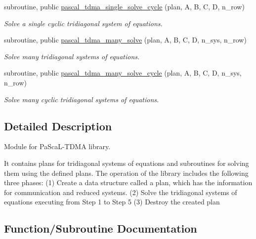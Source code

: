 \begin{DoxyCompactItemize}
subroutine, public \mbox{\hyperlink{namespacepascal__tdma_ac8e377fa86c75126380f0196f6046043}{pascal\+\_\+tdma\+\_\+single\+\_\+solve\+\_\+cycle}} (plan, A, B, C, D, n\+\_\+row)
\begin{DoxyCompactList}\small\item\em Solve a single cyclic tridiagonal system of equations. \end{DoxyCompactList}\item 
subroutine, public \mbox{\hyperlink{namespacepascal__tdma_afa0c78b8377f5fe1059907befda3c940}{pascal\+\_\+tdma\+\_\+many\+\_\+solve}} (plan, A, B, C, D, n\+\_\+sys, n\+\_\+row)
\begin{DoxyCompactList}\small\item\em Solve many tridiagonal systems of equations. \end{DoxyCompactList}\item 
subroutine, public \mbox{\hyperlink{namespacepascal__tdma_acbaed65e67ecbfd92a8f1d51d1b69fd5}{pascal\+\_\+tdma\+\_\+many\+\_\+solve\+\_\+cycle}} (plan, A, B, C, D, n\+\_\+sys, n\+\_\+row)
\begin{DoxyCompactList}\small\item\em Solve many cyclic tridiagonal systems of equations. \end{DoxyCompactList}\end{DoxyCompactItemize}


\subsection{Detailed Description}
Module for Pa\+Sca\+L-\/\+T\+D\+MA library. 

It contains plans for tridiagonal systems of equations and subroutines for solving them using the defined plans. The operation of the library includes the following three phases\+: (1) Create a data structure called a plan, which has the information for communication and reduced systems. (2) Solve the tridiagonal systems of equations executing from Step 1 to Step 5 (3) Destroy the created plan 

\subsection{Function/\+Subroutine Documentation}
\mbox{\label{namespacepascal__tdma_afa0c78b8377f5fe1059907befda3c940}} 
